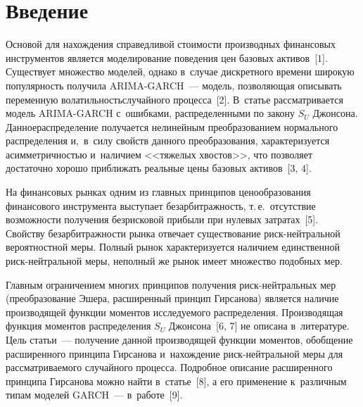 
  



\thispagestyle{headings}

\begin{multicols}{2}

\label{st\stat}


\section{Введение}

Основой для нахождения справедливой сто\-и\-мости производных финансовых 
инструментов является моделирование поведения цен базовых активов~[1]. 
Существует множество моделей, однако в~случае дискретного времени 
широкую популярность получила ARIMA-GARCH~--- модель, позволяющая 
описывать переменную волатильность\linebreak случайного процесса~[2]. В~статье 
рас\-смат\-ри\-ва\-ется модель ARIMA-GARCH с~ошибками, рас\-пределенными по 
закону $S_U$ Джонсона. Данное\linebreak распределение получается нелинейным 
преобразованием нормального распределения и,~в~силу свойств данного 
преобразования, характеризуется асим\-мет\-рич\-ностью и~наличием <<тяжелых 
хвостов>>, что позволяет достаточно хорошо приближать реальные цены 
базовых активов~[3, 4].

  На финансовых рынках одним из главных принципов ценообразования 
финансового инструмента выступает безарбитражность, т.\,е.\ отсутствие 
возможности получения безрисковой прибыли при нулевых затратах~[5]. 
Свойству безарбитражности рынка отвечает существование  
риск-нейт\-раль\-ной вероятностной меры. Полный рынок характеризуется 
наличием единственной риск-нейт\-раль\-ной меры, неполный же рынок имеет 
множество подобных мер.
  
  Главным ограничением многих принципов получения риск-нейтральных мер 
(преобразование Эшера, расширенный принцип Гирсанова) является наличие 
производящей функции моментов исследуемого распределения. Производящая 
функция моментов распределения $S_U$ Джонсона~[6, 7] не описана 
в~литературе. Цель статьи~--- получение данной производящей функции 
моментов, обобщение расширенного принципа Гирсанова и~на\-хож\-де\-ние 
риск-нейт\-раль\-ной меры для рас\-смат\-ри\-ва\-емо\-го случайного процесса. Подробное 
описание расширенного принципа Гирсанова можно найти в~статье~[8], а его 
применение к~различным типам моделей GARCH~--- в~работе~[9].
  

\end{multicols}
